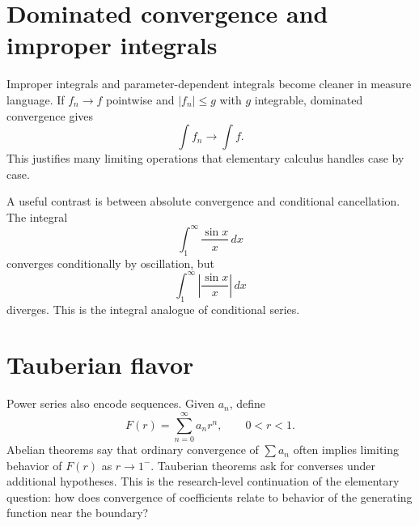\section{Dominated convergence and improper integrals}

Improper integrals and parameter-dependent integrals become cleaner in measure language.  If $f_n\to f$ pointwise and $|f_n|\le g$ with $g$ integrable, dominated convergence gives
\[
  \int f_n\to \int f.
\]
This justifies many limiting operations that elementary calculus handles case by case.

A useful contrast is between absolute convergence and conditional cancellation.  The integral
\[
  \int_1^{\infty}\frac{\sin x}{x}\,dx
\]
converges conditionally by oscillation, but
\[
  \int_1^{\infty}\left|\frac{\sin x}{x}\right|\,dx
\]
diverges.  This is the integral analogue of conditional series.

\section{Tauberian flavor}

Power series also encode sequences.  Given $a_n$, define
\[
  F(r)=\sum_{n=0}^{\infty}a_nr^n,\qquad 0<r<1.
\]
Abelian theorems say that ordinary convergence of $\sum a_n$ often implies limiting behavior of $F(r)$ as $r\to1^-$.  Tauberian theorems ask for converses under additional hypotheses.  This is the research-level continuation of the elementary question: how does convergence of coefficients relate to behavior of the generating function near the boundary?
